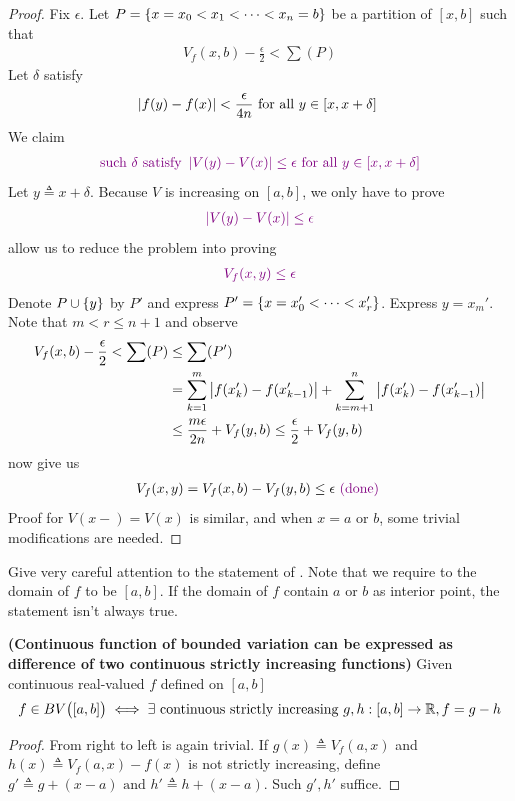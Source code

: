 \documentclass{report}
\begin{document}
\begin{proof}
Fix $\epsilon $. Let $P=\{ x=x_0<x_1 <\cdots < x_n=b \}$ be a partition of $[x,b]$ such that 
\begin{align*}
V_f(x,b) - \frac{\epsilon}{2} < \sum (P) 
\end{align*}
Let $\delta$ satisfy 
\begin{align*}
  \left|f(y)-f(x)\right|< \frac{\epsilon}{4n}\text{ for all $y \in [x,x+\delta]$ }
\end{align*}
We claim 
\begin{align*}
\textcolor{violet}{\text{ such }\delta\text{ satisfy }\left|V(y)-V(x)\right|\leq \epsilon\text{ for all $y\in [x,x+\delta]$ }}
\end{align*}
Let $y\triangleq x+\delta$. Because $V$ is increasing on  $[a,b]$, we only have to prove 
\begin{align*}
  \textcolor{violet}{\left|V(y)-V(x)\right|\leq  \epsilon }
\end{align*}
 allow us to reduce the problem into proving  
\begin{align*}
  \textcolor{violet}{V_f(x,y)\leq \epsilon }
\end{align*}
Denote $P\cup \{ y \}$ by $P'$ and express  $P'=\{ x=x_0' < \cdots < x_r'  \}$. Express $y=x_m'$. Note that $m<r\leq n+1$ and observe
\begin{align*}
  V_f(x,b)- \frac{\epsilon}{2}< \sum (P)&\leq \sum (P')\\
&= \sum_{k=1}^{m} \left|f(x'_k)-f(x'_{k-1})\right| + \sum_{k=m+1}^{n} \left|f(x'_k)-f(x'_{k-1})\right|\\
&\leq \frac{m\epsilon }{2n}  + V_f(y,b)\leq \frac{\epsilon }{2}+ V_f(y,b)
\end{align*}
 now give us 
\begin{align*}
V_f(x,y)=V_f(x,b)-V_f(y,b)\leq \epsilon  \textcolor{violet}{\text{ (done) }}
\end{align*}
Proof for $V(x-)=V(x)$ is similar, and when $x=a\text{ or }b$, some trivial modifications are needed.
\end{proof}
\begin{mdframed}
Give very careful attention to the statement of . Note that we require to the domain of $f$ to be $[a,b]$. If the domain of $f$ contain  $a\text{ or }b$ as interior point, the statement isn't always true. 
\end{mdframed}
\begin{corollary}
\textbf{(Continuous function of bounded variation can be expressed as difference of two continuous strictly increasing functions)} Given continuous real-valued $f$ defined on $[a,b]$ 
\begin{align*}
f\in BV\big([a,b] \big) \iff  \exists \text{ continuous strictly increasing }g,h:[a,b]\rightarrow \mathbb{R}, f=g-h
\end{align*}
\end{corollary}
\begin{proof}
From right to left is again trivial. If $g(x)\triangleq V_f(a,x)$ and $h(x)\triangleq V_f(a,x)-f(x)$ is not strictly increasing, define $g'\triangleq g+(x-a)\text{ and }h'\triangleq h+(x-a)$. Such $g',h'$ suffice.
\end{proof}
\end{document}
